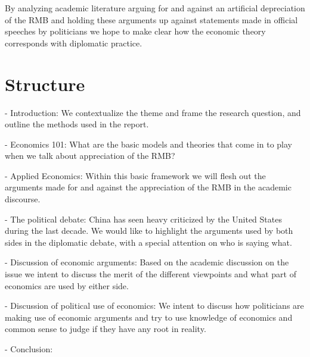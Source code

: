 \documentclass[11pt]{article}
\begin{document}
By analyzing academic literature arguing for and against an artificial 
depreciation of the RMB and holding these arguments up against 
statements made in official speeches by politicians we hope to make 
clear how the economic theory corresponds with diplomatic practice.

\section{Structure}

- Introduction: We contextualize the theme and frame the research 
question, and outline the methods used in the report.

- Economics 101: What are the basic models and theories that come in to 
play when we talk about appreciation of the RMB?

- Applied Economics: Within this basic framework we will flesh out the 
arguments made for and against the appreciation of the RMB in the 
academic discourse.

- The political debate: China has seen heavy criticized by the United 
States during the last decade. We would like to highlight the arguments 
used by both sides in the diplomatic debate, with a special attention on 
who is saying what.

- Discussion of economic arguments: Based on the academic discussion on 
the issue we intent to discuss the merit of the different viewpoints and 
what part of economics are used by either side.

%
- Discussion of political use of economics: We intent to discuss how 
politicians are making use of economic arguments and try to use 
knowledge of economics and common sense to judge if they have any root 
in reality.

- Conclusion: 


%
%
\end{document}
